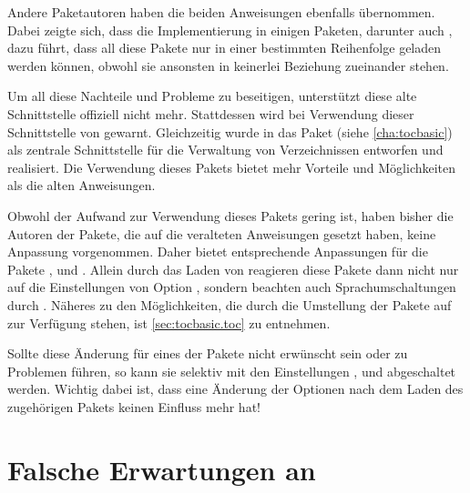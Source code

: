Andere Paketautoren haben die beiden Anweisungen ebenfalls übernommen. Dabei
zeigte sich, dass die Implementierung in einigen Paketen, darunter auch
, dazu führt, dass all diese Pakete nur in einer bestimmten
Reihenfolge geladen werden können, obwohl sie ansonsten in keinerlei Beziehung
zueinander stehen.

Um all diese Nachteile und Probleme zu beseitigen, unterstützt \KOMAScript{}
diese alte Schnittstelle offiziell nicht mehr. Stattdessen wird bei Verwendung
dieser Schnittstelle von \KOMAScript{} gewarnt. Gleichzeitig wurde in
\KOMAScript{} das Paket
 (siehe
\autoref{cha:tocbasic}) als zentrale Schnittstelle für die Verwaltung von
Verzeichnissen entworfen und realisiert. Die Verwendung dieses Pakets bietet
\iffalse weit \fi %
mehr Vorteile und Möglichkeiten als die
\iffalse beiden \fi %
alten Anweisungen.

Obwohl der Aufwand zur Verwendung dieses Pakets gering ist, haben bisher
die Autoren der Pakete, die auf die veralteten Anweisungen gesetzt haben,
keine Anpassung vorgenommen. Daher bietet 
entsprechende Anpassungen für die Pakete
,
 und
. Allein durch das Laden von
 reagieren diese Pakete dann nicht nur auf die Einstellungen
von Option
,
sondern beachten auch Sprachumschaltungen durch
. Näheres zu den Möglichkeiten, die
durch die Umstellung der Pakete auf  zur Verfügung
stehen, ist \autoref{sec:tocbasic.toc} zu entnehmen.

Sollte diese Änderung für eines der Pakete nicht erwünscht sein oder zu
Problemen führen, so kann sie selektiv mit den Einstellungen
,
%
 und
%
 abgeschaltet
werden. Wichtig dabei ist, dass eine Änderung der Optionen
nach dem Laden des zugehörigen Pakets keinen Einfluss mehr hat!


\section{Falsche Erwartungen an }

